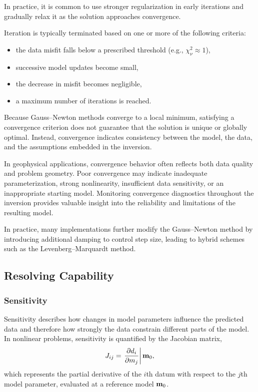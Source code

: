In practice, it is common to use stronger regularization in early iterations and gradually relax it as the solution approaches convergence.

Iteration is typically terminated based on one or more of the following criteria:
\begin{itemize}
    \item the data misfit falls below a prescribed threshold (e.g., $\chi_\nu^2 \approx 1$),
    \item successive model updates become small,
    \item the decrease in misfit becomes negligible,
    \item a maximum number of iterations is reached.
\end{itemize}

Because Gauss--Newton methods converge to a local minimum, satisfying a convergence criterion does not guarantee that the solution is unique or globally optimal. Instead, convergence indicates consistency between the model, the data, and the assumptions embedded in the inversion.

In geophysical applications, convergence behavior often reflects both data quality and problem geometry. Poor convergence may indicate inadequate parameterization, strong nonlinearity, insufficient data sensitivity, or an inappropriate starting model. Monitoring convergence diagnostics throughout the inversion provides valuable insight into the reliability and limitations of the resulting model.

In practice, many implementations further modify the Gauss--Newton method by introducing additional damping to control step size, leading to hybrid schemes such as the Levenberg--Marquardt method.

\subsection{Resolving Capability}
\subsubsection{Sensitivity}

Sensitivity describes how changes in model parameters influence the predicted data and therefore how strongly the data constrain different parts of the model. In nonlinear problems, sensitivity is quantified by the Jacobian matrix,
\[
    J_{ij} = \eval{\pdv{d_i}{m_j}}{\vb{m}_0},
\]
which represents the partial derivative of the $i$th datum with respect to the $j$th model parameter, evaluated at a reference model $\vb{m}_0$.

